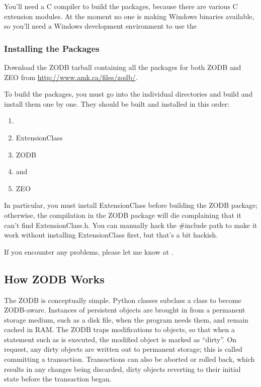 You'll need a C compiler to build the packages, because there are
various C extension modules.  At the moment no one is making Windows
binaries available, so you'll need a Windows development environment to use the 

\subsubsection{Installing the Packages}

Download the ZODB tarball containing all the packages for both ZODB
and ZEO from \url{http://www.amk.ca/files/zodb/}.

To build the packages, you must go into the individual directories and
build and install them one by one.  They should be built and installed
in this order:
 
\begin{enumerate}
  \item {}
  \item ExtensionClass
  \item ZODB
  \item {} and 
  \item ZEO
\end{enumerate}

In particular, you must install ExtensionClass before building the
ZODB package; otherwise, the compilation in the ZODB package will die
complaining that it can't find ExtensionClass.h.  You can manually
hack the \#include path to make it work without installing
ExtensionClass first, but that's a bit hackish.

If you encounter any problems, please let me know at
.

\subsection{How ZODB Works}

The ZODB is conceptually simple.  Python classes subclass a 
 class to become ZODB-aware. 
Instances of persistent objects are brought in from a permanent
storage medium, such as a disk file, when the program needs them, and
remain cached in RAM.  The ZODB traps modifications to objects, so
that when a statement such as  is executed, the
modified object is marked as ``dirty''.  On request, any dirty objects
are written out to permanent storage; this is called committing a
transaction.  Transactions can also be aborted or rolled back, which
results in any changes being discarded, dirty objects reverting to
their initial state before the transaction began.

